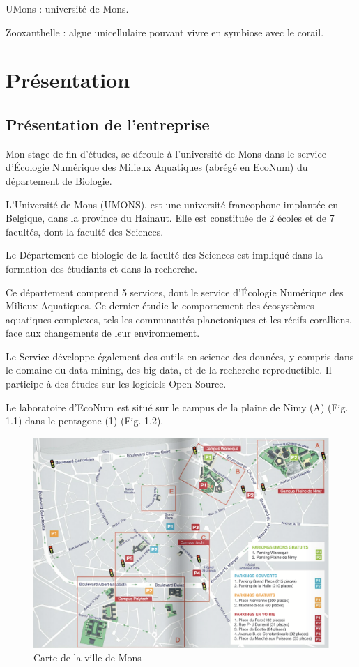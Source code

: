 \documentclass[]{report}
\begin{document}
UMons : université de Mons.

Zooxanthelle : algue unicellulaire pouvant vivre en symbiose avec le
corail.

\null
\newpage

\chapter{Présentation}\label{presentation}

\section{Présentation de
l'entreprise}\label{presentation-de-lentreprise}

Mon stage de fin d'études, se déroule à l'université de Mons dans le
service d'Écologie Numérique des Milieux Aquatiques (abrégé en EcoNum)
du département de Biologie.

L'Université de Mons (UMONS), est une université francophone implantée
en Belgique, dans la province du Hainaut. Elle est constituée de 2
écoles et de 7 facultés, dont la faculté des Sciences.

Le Département de biologie de la faculté des Sciences est impliqué dans
la formation des étudiants et dans la recherche.

Ce département comprend 5 services, dont le service d'Écologie Numérique
des Milieux Aquatiques. Ce dernier étudie le comportement des
écosystèmes aquatiques complexes, tels les communautés planctoniques et
les récifs coralliens, face aux changements de leur environnement.

Le Service développe également des outils en science des données, y
compris dans le domaine du data mining, des big data, et de la recherche
reproductible. Il participe à des études sur les logiciels Open Source.

Le laboratoire d'EcoNum est situé sur le campus de la plaine de Nimy (A)
(Fig. 1.1) dans le pentagone (1) (Fig. 1.2).

\begin{figure}
\centering
\includegraphics{../image/plan-campus.png}
\caption{Carte de la ville de Mons}
\end{figure}
\end{document}
